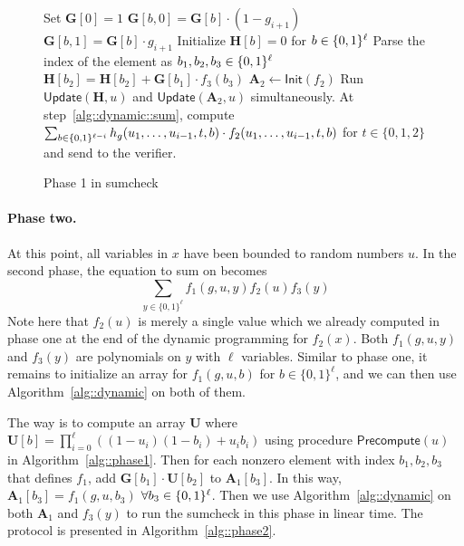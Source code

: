 \begin{figure}[ht!]
	\begin{algorithm}[H]
		\caption{Phase 1 in sumcheck}\label{alg::phase1}
		\begin{algorithmic}[1]
			\State Set $\textbf{G}[0] = 1$
				\State $\textbf{G}[b,0] = \textbf{G}[b]\cdot(1-g_{i+1})$
				\State $\textbf{G}[b,1] = \textbf{G}[b]\cdot g_{i+1}$
				\EndFor
			\EndFor
			\EndProcedure
			\State Initialize $\textbf{H}[b] = 0$ for $b\in\{0,1\}^\ell$
			\State Parse the index of the element as $b_1,b_2,b_3\in\{0,1\}^\ell$
			\State\label{alg::phase1::init} $\textbf{H}[b_2] = \textbf{H}[b_2]+ \textbf{G}[b_1]\cdot f_3(b_3)$
			\EndFor
			\EndProcedure
			\State $\textbf{A}_2\leftarrow\mathsf{Init}(f_2)$
			\State Run $\mathsf{Update}(\textbf{H},u)$ and $\mathsf{Update}(\textbf{A}_2,u)$ simultaneously. At step~\ref{alg::dynamic::sum}, compute $\sum_{b\in\{0,1\}^{\ell-i}}h_g(u_1,\ldots, u_{i-1}, t, b)\cdot f_2(u_1,\ldots, u_{i-1}, t, b)$ for $t\in\{0,1,2\}$ and send to the verifier.
			\EndProcedure
		\end{algorithmic}
	\end{algorithm}
\end{figure}

\paragraph{Phase two.} At this point, all variables in $x$ have been bounded to random numbers $u$. In the second phase, the equation to sum on becomes 
\[
\sum_{y\in\{0,1\}^\ell}f_1(g,u,y)f_2(u)f_3(y)
\]
Note here that $f_2(u)$ is merely a single value which we already computed in phase one at the end of the dynamic programming for $f_2(x)$. Both $f_1(g,u,y)$ and $f_3(y)$ are polynomials on $y$ with $\ell$ variables. Similar to phase one, it remains to initialize an array for $f_1(g,u,b)$ for $b\in\{0,1\}^\ell$, and we can then use Algorithm~\ref{alg::dynamic} on both of them.

The way is to compute an array \textbf{U} where $\textbf{U}[b] = \prod_{i=0}^\ell ((1-u_i)(1-b_i)+u_ib_i)$ using procedure $\mathsf{Precompute}(u)$ in Algorithm~\ref{alg::phase1}. Then for each nonzero element with index $b_1,b_2,b_3$ that defines $f_1$, add $\textbf{G}[b_1]\cdot\textbf{U}[b_2]$ to $\textbf{A}_1[b_3]$. In this way, $\textbf{A}_1[b_3]=f_1(g,u,b_3)$ $\forall b_3\in\{0,1\}^\ell$. Then we use Algorithm~\ref{alg::dynamic} on both $\textbf{A}_1$ and $f_3(y)$ to run the sumcheck in this phase in linear time. The protocol is presented in Algorithm~\ref{alg::phase2}.



